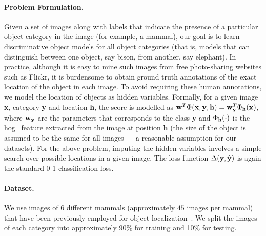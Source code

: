 \documentclass{article}
\newcommand{\myparagraph}[1]{\vspace{-2mm}\paragraph{#1}}
\begin{document}
\paragraph{Problem Formulation.} Given a set of images along with
labels that indicate the presence of a particular object
category in the image (for example, a mammal), 
our goal is to learn discriminative object models for all object categories (that is, models
that can distinguish between one object, say bison, from another, say
elephant). In practice, although it is easy to mine such images from
free photo-sharing websites such as Flickr, it is burdensome to obtain
ground truth annotations of the exact location of the object in each
image. To avoid requiring these human annotations, we model
the location of objects as hidden variables. Formally, for a given
image {\bf x}, category {\bf y} and location {\bf h}, the score 
is modelled as ${\bf w}^T\Phi({\bf x},{\bf y},{\bf h}) = {\bf w}_{\bf
  y}^T \Phi_{\bf h}({\bf x})$, where ${\bf w}_{\bf y}$ are the
parameters that corresponds to the class {\bf y} and $\Phi_{\bf
  h}(\cdot)$ is the {\sc hog}~\cite{dalalcvpr05,felzenszwalbcvpr08}
feature extracted from the image at position {\bf h} (the size of 
the object is assumed to be the same for all images --- a reasonable assumption for our datasets).
For the above problem, imputing the hidden variables involves a simple
search over possible locations in a given image.  The loss function
$\Delta({\bf y},\hat{\bf y})$ is again the standard 0-1 classification loss.

\myparagraph{Dataset.} We use images of $6$ different mammals (approximately $45$ images per mammal) that have been
previously employed for object localization~\cite{heitzijcv09}. We split the images of each category into approximately
90\% for training and 10\% for testing.
\end{document}
